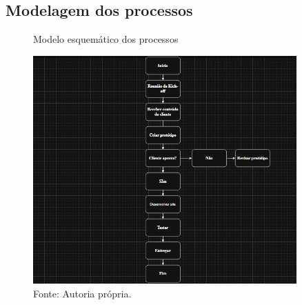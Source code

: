\subsection{Modelagem dos processos}

\begin{figure} [h!]	
    \centering

    \caption{Modelo esquemático dos processos}
    \includegraphics[width=0.9\textwidth]{Figures/modelo_esquematico_dos_processos.png}
    \caption*{Fonte: Autoria própria.}
    \label{fig:modelagem_dos_processos}
\end{figure}